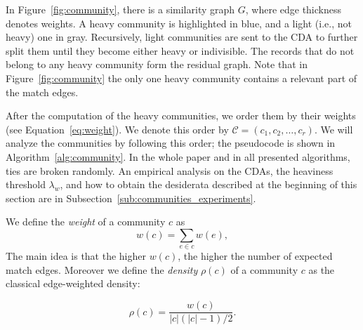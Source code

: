 \documentclass[sigconf, nonacm]{acmart}
\newcommand{\recall}{\textit{recall}\xspace}
\newcommand{\perbacco}{\texttt{pERbacco}\xspace}
\newcommand{\red}[1]{\textcolor{red}{#1}}
\begin{document}
In Figure~\ref{fig:community}, there is a  similarity graph $G$, where edge thickness denotes weights. A heavy community is highlighted in blue, and a light (i.e., not heavy) one in gray. Recursively, light communities are sent to the CDA to further split them until they become either heavy or indivisible. The records that do not belong to any heavy community form the residual graph. Note that in Figure~\ref{fig:community} the only one heavy community contains a relevant part of the match edges.


After the computation of the heavy communities, we order them by their weights (see Equation~\ref{eq:weight}). We denote this order by $\mathcal{C} = (c_1, c_2, \ldots, c_r)$. We will analyze the communities by following this order; the pseudocode is shown in Algorithm~\ref{alg:community}. In the whole paper and in all presented algorithms, ties are broken randomly.  An empirical analysis on the CDAs, the heaviness threshold $\lambda_w$, and how to obtain the desiderata described at the beginning of this section are in Subsection~\ref{sub:communities_experiments}.






We define the \emph{weight} of a community $c$ as
\begin{equation}\label{eq:weight}
     w(c) = \sum_{e\in c} w(e),
\end{equation}
The main idea is that the higher $w(c)$, the higher the number of expected match edges. Moreover we define the \emph{density} $\rho(c)$ of a community $c$ as the classical edge-weighted density:

\begin{equation}\label{eq:omega}
     \rho(c) = \frac{w(c)}{|c|(|c|-1)/2}.
\end{equation}

\end{document}
